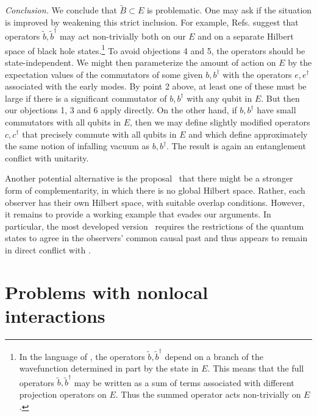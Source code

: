 \documentclass[12pt]{article}
\newcommand{\sect}[1]{\section{#1}\setcounter{equation}{0}}
\begin{document}
{\it Conclusion.} We conclude that $\tilde{B} \subset E$ is problematic.  One may ask if the situation is improved by weakening this strict inclusion.  For example, Refs. \cite{Nomura:2012sw,Nomura2,Nomura3} suggest that operators
$\tilde{b},\tilde{b}^\dagger$ may act non-trivially both on our $E$ and on a separate Hilbert space of black hole states.\footnote{In the language of \cite{Nomura:2012sw,Nomura2,Nomura3}, the operators $\tilde{b},\tilde{b}^\dagger$ depend on a branch of the wavefunction determined in part by the state in $E$.  This means that the full operators $\tilde{b},\tilde{b}^\dagger$ may be written as a sum of terms associated with different projection operators on $E$.  Thus the summed operator acts non-trivially on $E$.} To avoid objections 4 and 5, the operators should be state-independent. We might then parameterize the amount of action on $E$ by the expectation values of the commutators of some given $b, b^\dagger$ with the operators $e,e^\dagger$ associated with the early modes.  By point 2 above, at least one of these must be large if there is a significant commutator of
$b, b^\dagger$ with any qubit in $E$.  But then our objections 1, 3 and 6 apply directly. On the other hand, if $b, b^\dagger$ have small commutators with all qubits in $E$, then we may define slightly modified operators $c, c^\dagger$ that precisely commute with all qubits in $E$ and which define approximately the same notion of infalling vacuum as $b, b^\dagger$.  The result is again an entanglement conflict with unitarity.

Another potential alternative is the proposal~\cite{Bousso:2012as,Banks:2012nn,Harlow:2013tf,Susskind:2013tg} that there might be a stronger form of complementarity, in which there is no global Hilbert space.  Rather, each observer has their own Hilbert space, with suitable overlap conditions.  However, it remains to provide a working example that evades our arguments.  In particular, the most developed version~\cite{Banks:2012nn} requires the restrictions of the quantum states to agree in the observers' common causal past and thus appears to remain in direct conflict with \cite{Almheiri:2012rt}.

\sect{Problems with nonlocal interactions}
\label{noNL}
\end{document}
